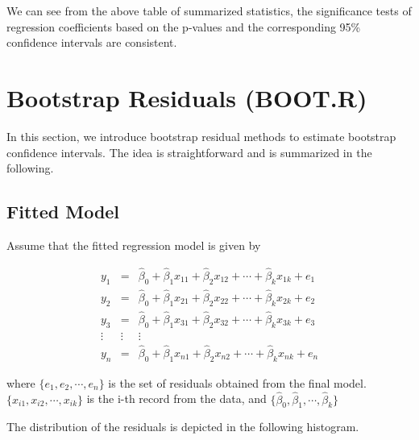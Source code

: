 \documentclass[
]{book}
\newenvironment{Shaded}{\begin{snugshade}}{\end{snugshade}}
\newcommand{\AttributeTok}[1]{\textcolor[rgb]{0.13,0.29,0.53}{#1}}
\newcommand{\DecValTok}[1]{\textcolor[rgb]{0.00,0.00,0.81}{#1}}
\newcommand{\FunctionTok}[1]{\textcolor[rgb]{0.13,0.29,0.53}{\textbf{#1}}}
\newcommand{\NormalTok}[1]{#1}
\newcommand{\SpecialCharTok}[1]{\textcolor[rgb]{0.81,0.36,0.00}{\textbf{#1}}}
\newcommand{\StringTok}[1]{\textcolor[rgb]{0.31,0.60,0.02}{#1}}
\begin{document}
We can see from the above table of summarized statistics, the significance tests of regression coefficients based on the p-values and the corresponding 95\% confidence intervals are consistent.

\hypertarget{bootstrap-residuals-boot.r}{%
\section{Bootstrap Residuals (BOOT.R)}\label{bootstrap-residuals-boot.r}}

In this section, we introduce bootstrap residual methods to estimate bootstrap confidence intervals. The idea is straightforward and is summarized in the following.

\hypertarget{fitted-model}{%
\subsection{Fitted Model}\label{fitted-model}}

Assume that the fitted regression model is given by

\[
\begin{array}{ccc} 
y_1 & = &  \hat{\beta}_0 + \hat{\beta}_1 x_{11} + \hat{\beta}_2 x_{12} + \cdots + \hat{\beta}_k x_{1k} + e_1  \\
y_2 & = &  \hat{\beta}_0 + \hat{\beta}_1 x_{21} + \hat{\beta}_2 x_{22} + \cdots + \hat{\beta}_k x_{2k} + e_2  \\
y_3 & = &  \hat{\beta}_0 + \hat{\beta}_1 x_{31} + \hat{\beta}_2 x_{32} + \cdots + \hat{\beta}_k x_{3k} + e_3  \\
\vdots & \vdots & \vdots \\
y_n & = &  \hat{\beta}_0 + \hat{\beta}_1 x_{n1} + \hat{\beta}_2 x_{n2} + \cdots + \hat{\beta}_k x_{nk} + e_n
\end{array}
\]

where \(\{e_1, e_2, \cdots, e_n \}\) is the set of residuals obtained from the final model. \(\{x_{i1}, x_{i2}, \cdots, x_{ik} \}\) is the i-th record from the data, and \(\{ \hat{\beta}_0, \hat{\beta}_1, \cdots, \hat{\beta}_k \}\)

The distribution of the residuals is depicted in the following histogram.

\begin{Shaded}
\end{Shaded}
\end{document}
